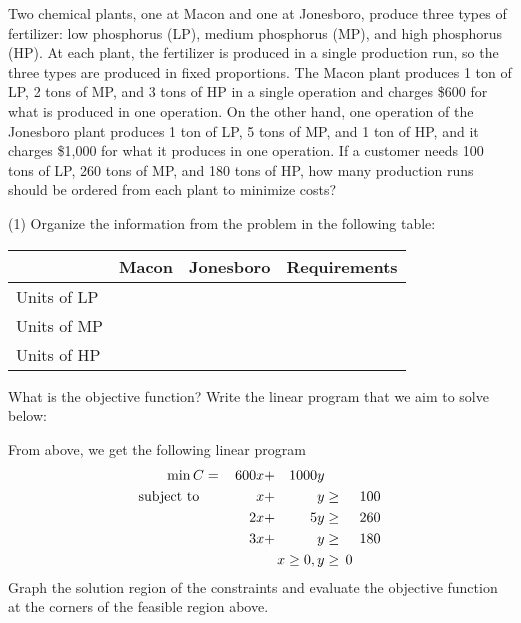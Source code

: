 \documentclass[../mathNotesPreamble]{subfiles}
\begin{document}
  \begin{ex*}
    Two chemical plants, one at Macon and one at Jonesboro, produce three types of fertilizer: low phosphorus (LP), medium phosphorus (MP), and high phosphorus (HP). At each plant, the fertilizer is produced in a single production run, so the three types are produced in fixed proportions. The Macon plant produces 1 ton of LP, 2 tons of MP, and 3 tons of HP in a single operation and charges \$600 for what is produced in one operation. On the other hand, one operation of the Jonesboro plant produces 1 ton of LP, 5 tons of MP, and 1 ton of HP, and it charges \$1,000 for what it produces in one operation. If a customer needs 100 tons of LP, 260 tons of MP, and 180 tons of HP, how many production runs should be ordered from each plant to minimize costs?
  \end{ex*}
  \begin{extasks}[after-item-skip=3\baselineskip](1)
    \task Organize the information from the problem in the following table:

      \begin{tabularx}{0.8\linewidth}{@{}*{4}{X}@{}}\toprule
        & Macon& Jonesboro& Requirements\\\midrule
        Units of LP \\
        Units of MP \\
        Units of HP \\\bottomrule
      \end{tabularx}
    \task What is the objective function?
    \task Write the linear program that we aim to solve below:
  \end{extasks}
  \pagebreak
  
  \begin{ex*}
    From above, we get the following linear program
    \begin{alignat*}{4}
      \min C&=&\,600x&+&1000y\\
      \textnormal{subject to }&& x&+&y&\geq& 100\\
        &&2x&+&5y&\geq &\,260\\
        &&3x&+&y&\geq& 180\\
        &&&&\mathllap{x\geq 0}, y&\geq\mathrlap{\,0}& 
    \end{alignat*}
    Graph the solution region of the constraints and evaluate the objective function at the corners of the feasible region above.
  \end{ex*}
\end{document}
